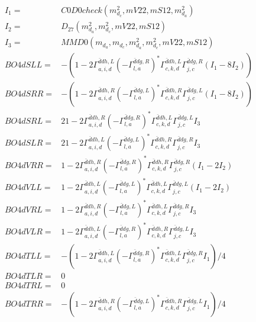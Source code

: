 \documentclass[A4,landscape]{article}
\begin{document}
\begin{align} 
I_1 = & C0D0check(m^2_{d_{{c}}}, mV22, mS12, m^2_{d_{{a}}}) \\ 
I_2 = & D_{27}(m^2_{d_{{a}}}, m^2_{d_{{c}}}, mV22, mS12) \\ 
I_3 = & MMD0(m_{d_{{a}}}, m_{d_{{c}}}, m^2_{d_{{a}}}, m^2_{d_{{c}}}, mV22, mS12) \\ 
  BO4dSLL= & -(1
-
2 \Gamma^{\bar{d}d h ,L}_{a, i, d} (- \Gamma^{\bar{d}d g ,R} _{l, a})^* \Gamma^{\bar{d}d h ,L}_{c, k, d} \Gamma^{\bar{d}d g ,R}_{j, c} (I_1 - 8 I_2)) \\ 
  BO4dSRR= & -(1
-
2 \Gamma^{\bar{d}d h ,R}_{a, i, d} (- \Gamma^{\bar{d}d g ,L} _{l, a})^* \Gamma^{\bar{d}d h ,R}_{c, k, d} \Gamma^{\bar{d}d g ,L}_{j, c} (I_1 - 8 I_2)) \\ 
  BO4dSRL= & 2 1
-
2 \Gamma^{\bar{d}d h ,R}_{a, i, d} (- \Gamma^{\bar{d}d g ,R} _{l, a})^* \Gamma^{\bar{d}d h ,L}_{c, k, d} \Gamma^{\bar{d}d g ,L}_{j, c} I_3 \\ 
  BO4dSLR= & 2 1
-
2 \Gamma^{\bar{d}d h ,L}_{a, i, d} (- \Gamma^{\bar{d}d g ,L} _{l, a})^* \Gamma^{\bar{d}d h ,R}_{c, k, d} \Gamma^{\bar{d}d g ,R}_{j, c} I_3 \\ 
  BO4dVRR= & 1
-
2 \Gamma^{\bar{d}d h ,R}_{a, i, d} (- \Gamma^{\bar{d}d g ,R} _{l, a})^* \Gamma^{\bar{d}d h ,R}_{c, k, d} \Gamma^{\bar{d}d g ,R}_{j, c} (I_1 - 2 I_2) \\ 
  BO4dVLL= & 1
-
2 \Gamma^{\bar{d}d h ,L}_{a, i, d} (- \Gamma^{\bar{d}d g ,L} _{l, a})^* \Gamma^{\bar{d}d h ,L}_{c, k, d} \Gamma^{\bar{d}d g ,L}_{j, c} (I_1 - 2 I_2) \\ 
  BO4dVRL= & 1
-
2 \Gamma^{\bar{d}d h ,R}_{a, i, d} (- \Gamma^{\bar{d}d g ,L} _{l, a})^* \Gamma^{\bar{d}d h ,L}_{c, k, d} \Gamma^{\bar{d}d g ,R}_{j, c} I_3 \\ 
  BO4dVLR= & 1
-
2 \Gamma^{\bar{d}d h ,L}_{a, i, d} (- \Gamma^{\bar{d}d g ,R} _{l, a})^* \Gamma^{\bar{d}d h ,R}_{c, k, d} \Gamma^{\bar{d}d g ,L}_{j, c} I_3 \\ 
  BO4dTLL= & -(1
-
2 \Gamma^{\bar{d}d h ,L}_{a, i, d} (- \Gamma^{\bar{d}d g ,R} _{l, a})^* \Gamma^{\bar{d}d h ,L}_{c, k, d} \Gamma^{\bar{d}d g ,R}_{j, c} I_1)/4 \\ 
  BO4dTLR= & 0 \\ 
  BO4dTRL= & 0 \\ 
  BO4dTRR= & -(1
-
2 \Gamma^{\bar{d}d h ,R}_{a, i, d} (- \Gamma^{\bar{d}d g ,L} _{l, a})^* \Gamma^{\bar{d}d h ,R}_{c, k, d} \Gamma^{\bar{d}d g ,L}_{j, c} I_1)/4 \\ 
\end{align} 
\end{document}
